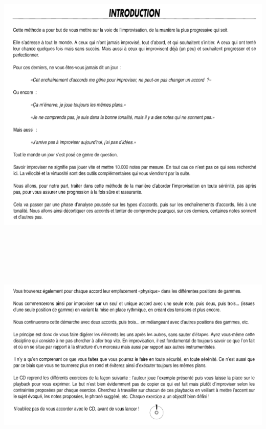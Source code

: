 \documentclass[a4paper]{book}
\begin{document}
\begin{center}
\includegraphics[width=17cm,height=14.533cm]{lebluessupportsmethodes-img103.png}
\end{center}






\clearpage

\begin{center}
\includegraphics[width=17cm,height=9.246cm]{lebluessupportsmethodes-img104.png}
\end{center}
\end{document}
